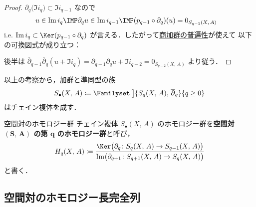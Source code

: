 \documentclass[algtopo_main]{subfiles}
\begin{document}
\begin{proof}
    $\partial_q \bigl(\Im i_q\bigr) \subset \Im i_{q-1}$ なので
    \begin{align}
        u \in \Im i_q &\IMP \partial_q u \in \Im i_{q-1} \IMP (p_{q-1} \circ \partial_q)(u) = 0_{S_{q-1}(X,\, A)}
    \end{align}
    i.e. $\Im i_q \subset \Ker(p_{q-1} \circ \partial_q)$ が言える．したがって\hyperref[lem:quomod-univ]{商加群の普遍性}が使えて
    以下の可換図式が成り立つ：
    \begin{figure}[H]
        \centering
    \end{figure}%
    
    後半は $\overline{\partial}_{q-1}\overline{\partial}_q (u + \Im i_q) = \partial_{q-1}\partial_{q} u + \Im i_{q-2} = 0_{S_{q-2}(X,\, A)}$ より従う．
\end{proof}

以上の考察から，加群と準同型の族
\begin{align}
    S_\bullet(X,\, A) \coloneqq \Familyset[\big]{S_q(X,\, A),\, \overline{\partial}_q}{q \ge 0}
\end{align}
はチェイン複体を成す．

\begin{mydef}[label=def:pairSH]{空間対のホモロジー群}
    チェイン複体 $S_\bullet (X,\, A)$ のホモロジー群を\textbf{空間対 $(\bm{S,\, A})$ の第 $\bm{q}$ のホモロジー群}と呼び，
    \begin{align}
        H_q(X,\, A) \coloneqq \frac{\Ker \bigl( \partial_q \colon S_q(X,\, A) \to S_{q-1}(X,\, A) \bigr) }{\Im \bigl( \partial_{q+1}\colon S_{q+1}(X,\, A) \to S_q(X,\, A) \bigr) }
    \end{align}
    と書く．
\end{mydef}

\subsection{空間対のホモロジー長完全列}
\end{document}
